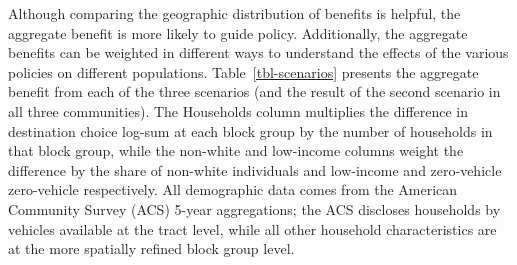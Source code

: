 \documentclass[
  letterpaper,
  number,
  review,
  doubleblind,
  3p]{elsarticle}
\begin{document}
\begin{table}

\caption{\label{tbl-scenarios}Scenario Benefits}


\end{table}%

Although comparing the geographic distribution of benefits is helpful,
the aggregate benefit is more likely to guide policy. Additionally, the
aggregate benefits can be weighted in different ways to understand the
effects of the various policies on different populations.
Table~\ref{tbl-scenarios} presents the aggregate benefit from each of
the three scenarios (and the result of the second scenario in all three
communities). The Households column multiplies the difference in
destination choice log-sum at each block group by the number of
households in that block group, while the non-white and low-income
columns weight the difference by the share of non-white individuals and
low-income and zero-vehicle zero-vehicle respectively. All demographic
data comes from the American Community Survey (ACS) 5-year aggregations;
the ACS discloses households by vehicles available at the tract level,
while all other household characteristics are at the more spatially
refined block group level.
\end{document}
